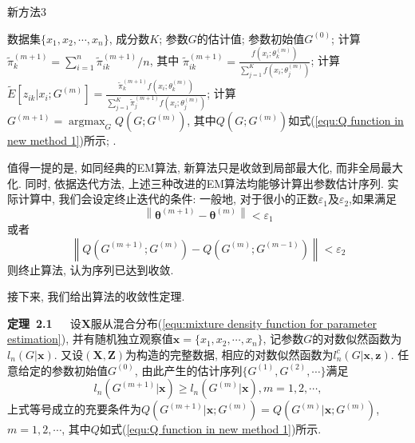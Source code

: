 \documentclass[a4paper,12pt,openany,oneside,utf-8]{ctexbook}
\newcommand{\xiaosihao}{\fontsize{12pt}{\baselineskip}\selectfont}
\begin{document}
\begin{algorithm}[h!]
  \caption{新方法3}%
  \label{alg:New method 3}
  \begin{algorithmic}[1] %
    \Require
      数据集$\{x_1, x_2, \cdots, x_n\}$, 成分数$K$;
    \Ensure
      参数$G$的估计值;
    \State 参数初始值$G^{(0)}$;
    \Repeat
      \State 计算$\tilde{\pi}_{k}^{(m+1)}=\sum_{i=1}^{n}\tilde{\pi}_{ik}^{(m+1)}/n$, 其中 $\tilde{\pi}_{ik}^{(m+1)}=\frac{f(x_i;\theta_k^{(m)})}{\sum_{j=1}^{K}f(x_i;\theta_j^{(m)})}$;
      \State 计算$\tilde{E}[z_{ik}|x_i;G^{(m)}]=\frac{\tilde{\pi}_{k}^{(m+1)}f(x_{i}; \theta_{k}^{(m)})}{\sum_{j=1}^{K}\tilde{\pi}_{j}^{(m+1)}f(x_{i}; \theta_{j}^{(m)})}$;
      \State 计算$G^{(m+1)}=\mathop{\arg\max}_{G} Q(G;G^{(m)})$, 其中$Q(G;G^{(m)})$如式(\ref{equ:Q function in new method 1})所示;
    .
  \end{algorithmic}
\end{algorithm}

值得一提的是, 如同经典的EM算法, 新算法只是收敛到局部最大化, 而非全局最大化. 同时, 依据迭代方法, 上述三种改进的EM算法均能够计算出参数估计序列. 实际计算中, 我们会设定终止迭代的条件: 一般地, 对于很小的正数$\varepsilon_1$及$\varepsilon_2$,如果满足
\begin{equation*}
\label{equ:convergence criterion 1}
  \left \| \bm{\theta}^{(m+1)}-\bm{\theta}^{(m)} \right \|< \varepsilon_1
\end{equation*}
或者
\begin{equation*}
\label{equ:convergence criterion 2}
  \left \| Q(G^{(m+1)};G^{(m)})-Q(G^{(m)};G^{(m-1)}) \right \|< \varepsilon_2
\end{equation*}
则终止算法, 认为序列已达到收敛.

接下来, 我们给出算法的收敛性定理.

\textbf{\xiaosihao 定理~2.1~}~~设$\bm{X}$服从混合分布(\ref{equ:mixture density function for parameter estimation}), 并有随机独立观察值$\bm{x}=\{x_1, x_2, \cdots, x_n\}$, 记参数$G$的对数似然函数为$l_{n}(G|\bm{x})$. 又设$(\bm{X}, \bm{Z})$为构造的完整数据, 相应的对数似然函数为$l_{n}^{c}(G|\bm{x}, \bm{z})$. 任意给定的参数初始值$G^{(0)}$, 由此产生的估计序列$\{G^{(1)}, G^{(2)}, \cdots\}$满足
\begin{equation}
\label{equ:monotonicity property}
  l_{n}(G^{(m+1)}|\bm{x}) \geq l_{n}(G^{(m)}|\bm{x}), m=1, 2, \cdots,
\end{equation}
上式等号成立的充要条件为$Q(G^{(m+1)}|\bm{x}; G^{(m)}) = Q(G^{(m)}|\bm{x}; G^{(m)})$, $m=1, 2, \cdots$, 其中$Q$如式(\ref{equ:Q function in new method 1})所示.
\end{document}
